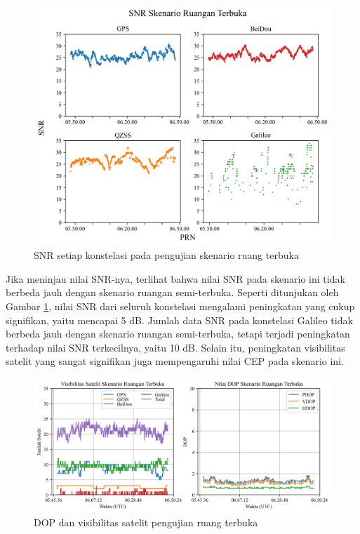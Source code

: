 \begin{figure}[H]
	\centering
	\includegraphics[width=13cm]{contents/chapter-4/4-skenario-outdoor/snr.png}
	\caption{SNR setiap konstelasi pada pengujian skenario ruang terbuka}
	\label{Fig: outdoor-snr}
\end{figure}

Jika meninjau nilai SNR-nya, terlihat bahwa nilai SNR pada skenario ini tidak berbeda jauh dengan skenario ruangan semi-terbuka. Seperti ditunjukan oleh Gambar \ref{Fig: outdoor-snr}, nilai SNR dari seluruh konstelasi mengalami peningkatan yang cukup signifikan, yaitu mencapai 5 dB. Jumlah data SNR pada konstelasi Galileo tidak berbeda jauh dengan skenario ruangan semi-terbuka, tetapi terjadi peningkatan terhadap nilai SNR terkecilnya, yaitu 10 dB. Selain itu, peningkatan visibilitas satelit yang sangat signifikan juga mempengaruhi nilai CEP pada skenario ini. 

\begin{figure}[H]
	\centering
	\begin{adjustbox}{width=\textwidth}
		\includegraphics{contents/chapter-4/4-skenario-outdoor/sats_dop.png}
	\end{adjustbox}
	\caption{DOP dan visibilitas satelit pengujian ruang terbuka}
	\label{Fig: outdoor-dop_sats}
\end{figure}

